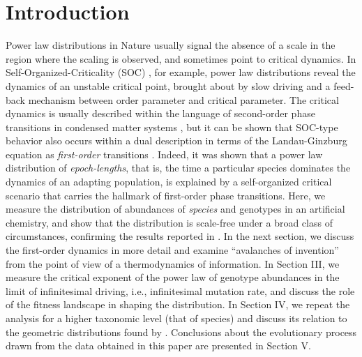 \section{Introduction}

Power law distributions in Nature usually signal the absence of a
scale in the region where the scaling is observed, and sometimes point
to critical dynamics. In Self-Organized-Criticality (SOC)
\cite{BTW87,BTW88}, for example, power law distributions reveal the
dynamics of an unstable critical point, brought about by slow driving
and a feed-back mechanism between order parameter and critical
parameter.  The critical dynamics is usually described within the
language of second-order phase transitions in condensed matter systems
\cite{SJD}, but it can be shown that SOC-type behavior also occurs
within a dual description in terms of the Landau-Ginzburg equation as
{\em first-order} transitions \cite{GS}.  Indeed, it was shown that a
power law distribution of {\em epoch-lengths}, that is, the time a
particular species dominates the dynamics of an adapting population,
is explained by a self-organized critical scenario \cite{CA2} that
carries the hallmark of first-order phase transitions. Here, we
measure the distribution of abundances of {\em species} and genotypes
in an artificial chemistry, and show that the distribution is scale-free under
a broad class of circumstances, confirming the results reported in
\cite{CA2}.  In the next section, we discuss the first-order dynamics
in more detail and examine ``avalanches of invention'' from the point
of view of a thermodynamics of information. In Section III, we measure
the critical exponent of the power law of genotype abundances in the
limit of infinitesimal driving, i.e., infinitesimal mutation rate, and
discuss the role of the fitness landscape in shaping the
distribution. In Section IV, we repeat the analysis for a higher
taxonomic level (that of species) and discuss its relation to the
geometric distributions found by \cite{BUR90,BUR93}.
Conclusions about the evolutionary process drawn from the data
obtained in this paper are presented in Section V.
